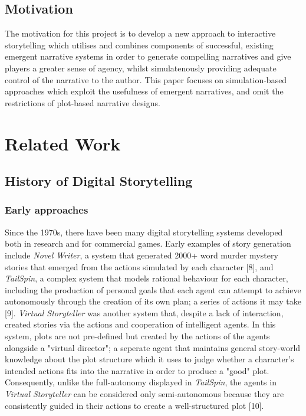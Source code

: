 \documentclass{sig-alternate-05-2015}
\begin{document}
\subsection{Motivation}

\noindent The motivation for this project is to develop a new approach to interactive storytelling which utilises and combines components of successful, existing emergent narrative systems in order to generate compelling narratives and give players a greater sense of agency, whilst simulatenously providing adequate control of the narrative to the author. This paper focuses on simulation-based approaches which exploit the usefulness of emergent narratives, and omit the restrictions of plot-based narrative designs.

\section{Related Work}
\subsection{History of Digital Storytelling}
\subsubsection{Early approaches}
Since the 1970s, there have been many digital storytelling systems developed both in research and for commercial games. Early examples of story generation include \textit{Novel Writer}, a system that generated 2000+ word murder mystery stories that emerged from the actions simulated by each character [8], and \textit{TailSpin}, a complex system that models rational behaviour for each character, including the production of personal goals that each agent can attempt to achieve autonomously through the creation of its own plan; a series of actions it may take [9]. \textit{Virtual Storyteller} was another system that, despite a lack of interaction, created stories via the actions and cooperation of intelligent agents. In this system, plots are not pre-defined but created by the actions of the agents alongside a "virtual director"; a seperate agent that maintains general story-world knowledge about the plot structure which it uses to judge whether a character's intended actions fits into the narrative in order to produce a "good" plot. Consequently, unlike the full-autonomy displayed in \textit{TailSpin}, the agents in \textit{Virtual Storyteller} can be considered only semi-autonomous because they are consistently guided in their actions to create a well-structured plot [10]. 
\end{document}
